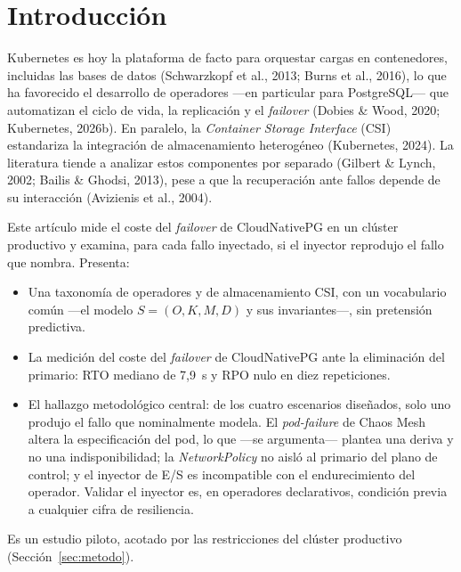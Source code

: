\documentclass[12pt,twocolumn,letterpaper]{article}
\begin{document}
\justifying

\section{Introducción}\label{sec:intro}
Kubernetes es hoy la plataforma de facto para orquestar cargas en contenedores, incluidas las bases de datos (Schwarzkopf et al., 2013; Burns et al., 2016), lo que ha favorecido el desarrollo de operadores —en particular para PostgreSQL— que automatizan el ciclo de vida, la replicación y el \textit{failover} (Dobies \& Wood, 2020; Kubernetes, 2026b). En paralelo, la \textit{Container Storage Interface} (CSI) estandariza la integración de almacenamiento heterogéneo (Kubernetes, 2024). La literatura tiende a analizar estos componentes por separado (Gilbert \& Lynch, 2002; Bailis \& Ghodsi, 2013), pese a que la recuperación ante fallos depende de su interacción (Avizienis et al., 2004).

Este artículo mide el coste del \textit{failover} de CloudNativePG en un clúster productivo y examina, para cada fallo inyectado, si el inyector reprodujo el fallo que nombra. Presenta:
\begin{itemize}[leftmargin=1.2em,itemsep=2pt,topsep=2pt]
\item Una taxonomía de operadores y de almacenamiento CSI, con un vocabulario común —el modelo $S=(O,K,M,D)$ y sus invariantes—, sin pretensión predictiva.
\item La medición del coste del \textit{failover} de CloudNativePG ante la eliminación del primario: RTO mediano de 7,9~s y RPO nulo en diez repeticiones.
\item El hallazgo metodológico central: de los cuatro escenarios diseñados, solo uno produjo el fallo que nominalmente modela. El \textit{pod-failure} de Chaos Mesh altera la especificación del pod, lo que —se argumenta— plantea una deriva y no una indisponibilidad; la \textit{NetworkPolicy} no aisló al primario del plano de control; y el inyector de E/S es incompatible con el endurecimiento del operador. Validar el inyector es, en operadores declarativos, condición previa a cualquier cifra de resiliencia.
\end{itemize}
Es un estudio piloto, acotado por las restricciones del clúster productivo (Sección~\ref{sec:metodo}).
\end{document}

